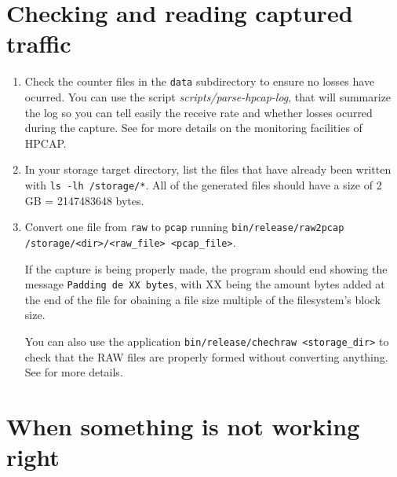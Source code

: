 \documentclass[a4paper,oneside]{hpman}
\begin{document}
\section{Checking and reading captured traffic}
\label{sec:QuickStatus}

\begin{enumerate}
\item Check the counter files in the \texttt{data} subdirectory to ensure no losses have ocurred. You can use the script \textit{scripts/parse-hpcap-log}, that will summarize the log so you can tell easily the receive rate and whether losses ocurred during the capture. See  for more details on the monitoring facilities of HPCAP.

\item In your storage target directory, list the files that have already been written with \texttt{ls -lh /storage/*}. All of the generated files should have a size of 2 GB = 2147483648 bytes.

\item Convert one file from \texttt{raw} to \texttt{pcap} running \texttt{bin/release/raw2pcap  /storage/<dir>/<raw\_file>  <pcap\_file>}.

If the capture is being properly made, the program should end showing the message \texttt{Padding de XX bytes}, with XX being the amount bytes added at the end of the file for obaining a file size multiple of the filesystem's block size.

You can also use the application \texttt{bin/release/chechraw <storage\_dir>} to check that the RAW files are properly formed without converting anything. See  for more details.
\end{enumerate}

\section{When something is not working right}
\end{document}

